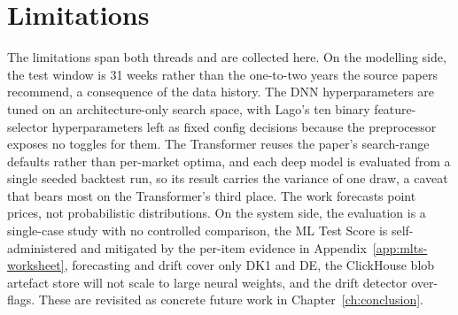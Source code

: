 \section{Limitations}

The limitations span both threads and are collected here. On the modelling side,
the test window is 31 weeks rather than the one-to-two years the source papers
recommend, a consequence of the data history. The DNN hyperparameters are tuned
on an architecture-only search space, with Lago's ten binary feature-selector
hyperparameters left as fixed config decisions because the preprocessor exposes
no toggles for them. The Transformer reuses the paper's search-range defaults
rather than per-market optima, and each deep model is evaluated from a single
seeded backtest run, so its result carries the variance of one draw, a caveat
that bears most on the Transformer's third place. The work forecasts point
prices, not probabilistic distributions. On the system side, the evaluation is a
single-case study with no controlled comparison, the ML Test Score is
self-administered and mitigated by the per-item evidence in
Appendix~\ref{app:mlts-worksheet}, forecasting and drift cover only DK1 and DE,
the ClickHouse blob artefact store will not scale to large neural weights, and
the drift detector over-flags. These are revisited as concrete future work in
Chapter~\ref{ch:conclusion}.

